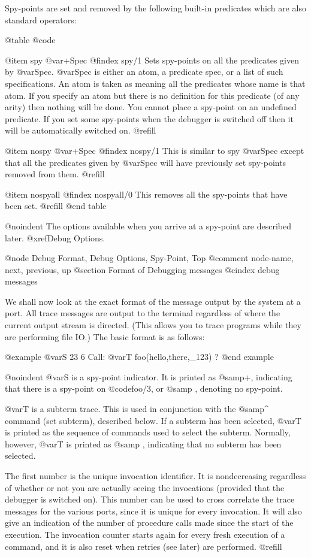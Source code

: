 Spy-points are set and removed by the following built-in predicates which
are also standard operators:

@table @code

@item spy @var{+Spec}
@findex spy/1
Sets spy-points on all the predicates given by @var{Spec}.  @var{Spec}
is either an atom, a predicate spec, or a list of such specifications.
An atom is taken as meaning all the predicates whose name is that atom.
If you specify an atom but there is no definition for this predicate (of
any arity) then nothing will be done.  You cannot place a spy-point on
an undefined predicate.  If you set some spy-points when the debugger is
switched off then it will be automatically switched on. @refill

@item nospy @var{+Spec}
@findex nospy/1
This is similar to spy @var{Spec} except that all the predicates given
by @var{Spec} will have previously set spy-points removed from them.
@refill

@item nospyall
@findex nospyall/0
This removes all the spy-points that have been set. @refill
@end table

@noindent
The options available when you arrive at a spy-point are described later.
@xref{Debug Options}.

@node Debug Format, Debug Options, Spy-Point, Top
@comment  node-name,  next,  previous,  up
@section Format of Debugging messages
@cindex debug messages

We shall now look at the exact format of the message output by the
system at a port.  All trace messages are output to the terminal
regardless of where the current output stream is directed.  (This allows
you to trace programs while they are performing file IO.)  The basic
format is as follows:

@example
@var{S} 23  6  Call: @var{T} foo(hello,there,_123) ?
@end example

@noindent
@var{S} is a spy-point indicator.  It is printed as @samp{+}, indicating
that there is a spy-point on @code{foo/3}, or @samp{ }, denoting no
spy-point.

@var{T} is a subterm trace.  This is used in conjunction with the
@samp{^} command (set subterm), described below.  If a subterm has been
selected, @var{T} is printed as the sequence of commands used to select
the subterm.  Normally, however, @var{T} is printed as @samp{ },
indicating that no subterm has been selected.

The first number is the unique invocation identifier.  It is
nondecreasing regardless of whether or not you are actually seeing the
invocations (provided that the debugger is switched on).  This number
can be used to cross correlate the trace messages for the various ports,
since it is unique for every invocation.  It will also give an
indication of the number of procedure calls made since the start of the
execution.  The invocation counter starts again for every fresh
execution of a command, and it is also reset when retries (see later)
are performed. @refill

